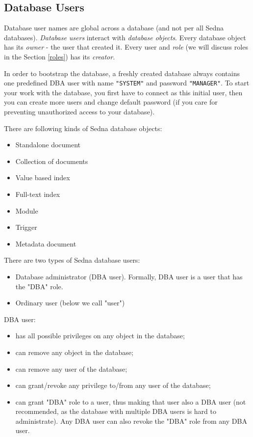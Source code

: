 \documentclass[a4paper,12pt]{article}
\newenvironment{citemize}
{\begin{itemize}
  \setlength{\itemsep}{0pt}
  \setlength{\parskip}{0pt}
  \setlength{\parsep}{0pt}}
{\end{itemize}}
\begin{document}
\subsection{Database Users}

Database user names are global across a database (and not per all Sedna
databases). \emph{Database users} interact with \emph{database objects}. Every
database object has its \emph{owner} - the user that created it. Every user and
\emph{role} (we will discuss roles in the Section \ref{roles}) has its
\emph{creator}.

In order to bootstrap the database, a freshly created database always contains
one predefined DBA user with name \verb!"SYSTEM"! and password \verb!"MANAGER"!.
To start your work with the database, you first have to connect as this initial
user, then you can create more users and change default password (if you care
for preventing unauthorized access to your database).

There are following kinds of Sedna database objects:
\begin{citemize}
\item Standalone document
\item Collection of documents
\item Value based index
\item Full-text index
\item Module
\item Trigger
\item Metadata document
\end{citemize}

There are two types of Sedna database users:

\begin{citemize}
\item Database administrator (DBA user). Formally, DBA user is a user that has
the "DBA" role.
\item Ordinary user (below we call "user")
\end{citemize}

DBA user:
\begin{citemize}
\item has all possible privileges on any object in the database;
\item can remove any object in the database;
\item can remove any user of the database;
\item can grant/revoke any privilege to/from any user of the database;
\item can grant "DBA" role to a user, thus making that user also a DBA user
(not recommended, as the database with multiple DBA users is hard to
administrate). Any DBA user can also revoke the "DBA" role from any DBA user.
\end{citemize}
\end{document}
